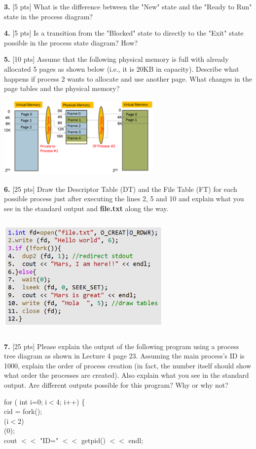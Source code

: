\documentclass[12pt]{article}
\newcommand\tab[1][1cm]{\hspace*{#1}}
\begin{document}
{\bf 3.} [5 pts] What is the difference between the "New" state and the "Ready to Run" state in the process diagram?

{\bf 4.} [5 pts] Is a transition from the "Blocked" state to directly to the "Exit" state possible in the process state diagram? How?

{\bf 5.} [10 pts] Assume that the following physical memory is full with already allocated 5 pages as shown below (i.e., it is 20KB in capacity). Describe what happens if process 2 wants to allocate and use another page. What changes in the page tables and the physical memory? 

\begin{center}
\includegraphics[width=8cm, height=4cm]{313Quiz2P5}
\end{center}

{\bf 6.} [25 pts] Draw the Descriptor Table (DT) and the File Table (FT) for each possible process just after executing the lines 2, 5 and 10 and explain what you see in the standard output and {\bf file.txt} along the way. 

\begin{center}
\includegraphics[width=8.5cm, height=6cm]{P6}
\end{center}

{\bf 7.} [25 pts] Please explain the output of the following program using a process tree diagram as shown in Lecture 4 page 23. Assuming the main process's ID is 1000, explain the order of process creation (in fact, the number itself should show what order the processes are created). Also explain what you see in the standard output. Are different outputs possible for this program? Why or why not? 

\noindent
{\color{violet} for} ({\color{blue} int} i={\color{Green}0}; i$<${\color{Green}4}; i++) \{\\
\tab{\color{blue}int} cid = {\color{RawSienna}fork}();\\
\tab{\color{violet}if}(i$<${\color{Green}2})\\
\tab\tab{\color{RawSienna}wait}({\color{Green}0});\\
\tab cout $<<$ {\color{Maroon}"ID="} $<<$ {\color{RawSienna}getpid}() $<<$ endl;\\
\end{document}
